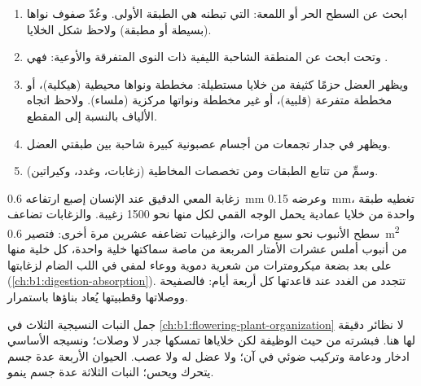 \begin{method}\label{met:b1:body-plans-tissues:histology}
\begin{enumerate}
  \item ابحث عن السطح الحر أو اللمعة:  التي تبطنه هي الطبقة
        الأولى. وعُدّ صفوف نواها (بسيطة أو مطبقة) ولاحظ شكل الخلايا.
  \item وتحت  ابحث عن المنطقة الشاحبة الليفية ذات النوى
        المتفرقة والأوعية: فهي .
  \item ويظهر العضل حزمًا كثيفة من خلايا مستطيلة: مخططة ونواها
        محيطية (هيكلية)، أو مخططة متفرعة (قلبية)، أو غير مخططة
        ونواتها مركزية (ملساء). ولاحظ اتجاه الألياف بالنسبة إلى
        المقطع.
  \item ويظهر  في جدار  تجمعات من أجسام عصبونية
        كبيرة شاحبة بين طبقتي العضل.
  \item وسمِّ  من تتابع الطبقات ومن تخصصات المخاطية (زغابات،
        وغدد، وكيراتين).
\end{enumerate}
\end{method}

\begin{example}\label{ex:b1:body-plans-tissues:villus}
زغابة المعي الدقيق عند الإنسان إصبع ارتفاعه \qty{0.6}{mm} وعرضه
\qty{0.15}{mm}، تغطيه طبقة واحدة من خلايا عمادية يحمل الوجه القمي
لكل منها نحو \qty{1500}{} زغيبة. والزغابات تضاعف سطح الأنبوب نحو سبع
مرات، والزغيبات تضاعفه عشرين مرة أخرى: فتصير \qty{0.6}{m^2} من أنبوب
أملس عشرات الأمتار المربعة من  ماصة سماكتها خلية واحدة، كل خلية
منها على بعد بضعة ميكرومترات من شعرية دموية ووعاء لمفي في اللب الضام
لزغابتها (\cref{ch:b1:digestion-absorption}).  تتجدد من
الغدد عند قاعدتها كل أربعة أيام: فالصفيحة ووصلاتها وقطبيتها يُعاد
بناؤها باستمرار.
\end{example}

\begin{remark}\label{rem:b1:body-plans-tissues:plants}
جمل النبات النسيجية الثلاث في
\cref{ch:b1:flowering-plant-organization} لا نظائر دقيقة لها هنا.
فبشرته  من حيث الوظيفة لكن خلاياها تمسكها جدر لا وصلات؛ ونسيجه
الأساسي ادخار ودعامة وتركيب ضوئي في آن؛ ولا عضل له ولا عصب. 
الحيوان الأربعة عدة جسم يتحرك ويحس؛  النبات الثلاثة عدة جسم
ينمو.
\end{remark}

